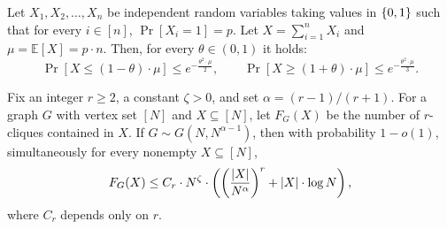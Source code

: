 \begin{theorem}\label{thm:chernoff}
    Let $X_1, X_2, \ldots, X_n$ be independent random variables taking values in $\mathopen{}\left\{ 0,1 \right\}$ such that for every $i\in[n]$, $\Pr[X_i=1]=p$. Let $X=\sum_{i=1}^n X_i$ and $\mu=\mathbb{E}[X]=p\cdot n$. Then, for every $\theta\in(0,1)$ it holds:
    \[
        \Pr[X\leq (1-\theta)\cdot\mu] \leq e^{-\frac{\theta^2\cdot\mu}{2}},
        \qquad \Pr[X\geq (1+\theta)\cdot\mu] \leq e^{-\frac{\theta^2\cdot\mu}{3}}.
    \]
\end{theorem}

\begin{lemma}\label{lem:PDS-clique-count}
    Fix an integer $r\geq2$, a constant $\zeta>0$, and set $\alpha=(r-1)/(r+1)$. For a graph $G$ with vertex set $[N]$ and $X\subseteq[N]$, let $F_G(X)$ be the number of $r$-cliques contained in $X$. If $G\sim G(N,N^{\alpha-1})$, then with probability $1-o(1)$, simultaneously for every nonempty $X\subseteq[N]$,
    \[
        F_G(X)\leq C_r \cdot N^\zeta \cdot \mathopen{}\left( \mathopen{}\left( \frac{\mathopen{}\left| X \right|}{N^\alpha} \right)^r+\mathopen{}\left| X \right| \cdot \log N \right),
    \]
    where $C_r$ depends only on $r$.
\end{lemma}
